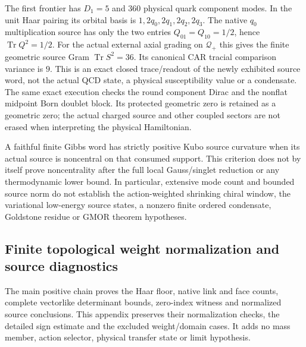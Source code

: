 \documentclass[12pt,a4paper]{article}
\begin{document}
The first frontier has $D_1=5$ and $360$ physical quark component modes.
In the unit Haar pairing its orbital basis is
$1,2q_0,2q_1,2q_2,2q_3$. The native $q_0$ multiplication source has only
the two entries $Q_{01}=Q_{10}=1/2$, hence
$\operatorname{Tr}Q^2=1/2$. For the actual external axial grading on
$\mathcal Q_+$ this gives the finite geometric source Gram
$\operatorname{Tr}S^2=36$. Its canonical CAR tracial comparison variance
is $9$. This is an exact closed trace/readout of the newly exhibited source
word, not the actual QCD state, a physical susceptibility value or a
condensate. The same exact execution checks the round component Dirac and
the nonflat midpoint Born doublet block. Its protected geometric zero is
retained as a geometric zero; the actual charged source and other coupled
sectors are not erased when interpreting the physical Hamiltonian.

A faithful finite Gibbs word has strictly positive Kubo source curvature
when its actual source is noncentral on that consumed support. This criterion
does not by itself prove noncentrality after the full local Gauss/singlet
reduction or any thermodynamic lower bound. In particular, extensive mode
count and bounded source norm do not establish the action-weighted shrinking
chiral window, the variational low-energy source states, a nonzero finite
ordered condensate, Goldstone residue or GMOR theorem hypotheses.




\subsection{Finite topological weight normalization and source diagnostics}
\label{p10:app:v2189-topological-weight-diagnostics}

The main positive chain proves the Haar floor, native link and face counts,
complete vectorlike determinant bounds, zero-index witness and normalized
source conclusions. This appendix preserves their normalization checks,
the detailed sign estimate and the excluded weight/domain cases. It adds
no mass member, action selector, physical transfer state or limit hypothesis.


\end{document}
